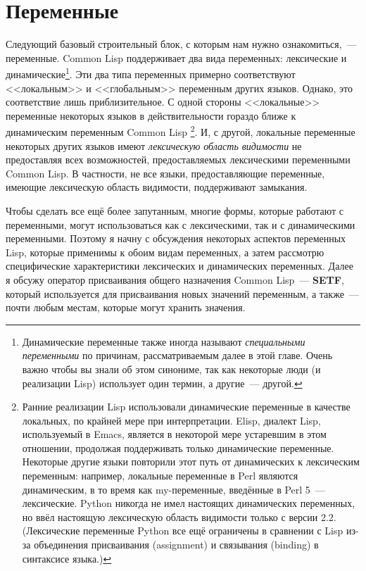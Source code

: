 \chapter{Переменные}
\label{ch:06}

Следующий базовый строительный блок, с которым нам нужно ознакомиться,~---
переменные. Common Lisp поддерживает два вида переменных: лексические и
динамические\footnote{Динамические переменные также иногда называют \textit{специальными
    переменными} по причинам, рассматриваемым далее в этой главе. Очень важно чтобы вы
  знали об этом синониме, так как некоторые люди (и реализации Lisp) использует один
  термин, а другие~--- другой.}. Эти два типа переменных примерно соответствуют
<<локальным>> и <<глобальным>> переменным других языков. Однако, это соответствие лишь
приблизительное. С одной стороны <<локальные>> переменные некоторых языков в
действительности гораздо ближе к динамическим переменным Common Lisp \footnote{Ранние
  реализации Lisp использовали динамические переменные в качестве локальных, по крайней
  мере при интерпретации. Elisp, диалект Lisp, используемый в Emacs, является в некоторой
  мере устаревшим в этом отношении, продолжая поддерживать только динамические
  переменные. Некоторые другие языки повторили этот путь от динамических к лексическим
  переменным: например, локальные переменные в Perl являются динамическим, в то время как
  my-переменные, введённые в Perl 5~--- лексические. Python никогда не имел настоящих
  динамических переменных, но ввёл настоящую лексическую область видимости только с версии
  2.2. (Лексические переменные Python все ещё ограничены в сравнении с Lisp из-за
  объединения присваивания (assignment) и связывания (binding) в синтаксисе языка.) }. И,
с другой, локальные переменные некоторых других языков имеют \textit{лексическую область
  видимости} не предоставляя всех возможностей, предоставляемых лексическими переменными
Common Lisp. В частности, не все языки, предоставляющие переменные, имеющие лексическую
область видимости, поддерживают замыкания.

Чтобы сделать все ещё более запутанным, многие формы, которые работают с переменными,
могут использоваться как с лексическими, так и с динамическими переменными. Поэтому я
начну с обсуждения некоторых аспектов переменных Lisp, которые применимы к обоим видам
переменных, а затем рассмотрю специфические характеристики лексических и динамических
переменных. Далее я обсужу оператор присваивания общего назначения Common Lisp~---
\textbf{SETF}, который используется для присваивания новых значений переменным, а также~---
почти любым местам, которые могут хранить значения.

